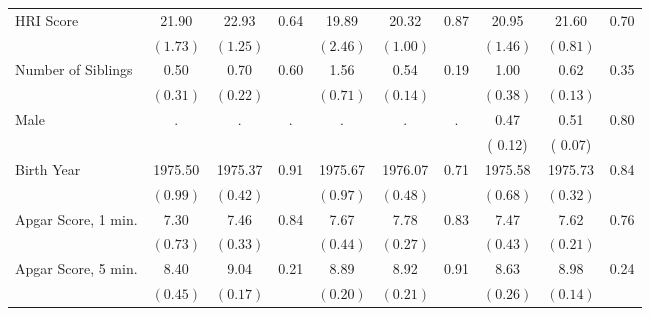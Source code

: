 \begin{tabular}{l c c c c c c c c c}
HRI Score &     21.90 &     22.93 &      0.64 &     19.89 &     20.32 &      0.87 &     20.95 &     21.60 &      0.70 \\
     & $ (     1.73) $ & $ (     1.25) $  & & $ (     2.46) $ & $ (     1.00) $ & & $ (     1.46) $ & $ (     0.81) $  & \\
Number of Siblings &      0.50 &      0.70 &      0.60 &      1.56 &      0.54 &      0.19 &      1.00 &      0.62 &      0.35 \\
     & $ (     0.31) $ & $ (     0.22) $  & & $ (     0.71) $ & $ (     0.14) $ & & $ (     0.38) $ & $ (     0.13) $  & \\
Male & . & . & . & . & . & . &      0.47 &      0.51 &      0.80 \\
&  & & & &  & & (     0.12) & (     0.07)  & \\
Birth Year &   1975.50 &   1975.37 &      0.91 &   1975.67 &   1976.07 &      0.71 &   1975.58 &   1975.73 &      0.84 \\
     & $ (     0.99) $ & $ (     0.42) $  & & $ (     0.97) $ & $ (     0.48) $ & & $ (     0.68) $ & $ (     0.32) $  & \\
Apgar Score, 1 min. &      7.30 &      7.46 &      0.84 &      7.67 &      7.78 &      0.83 &      7.47 &      7.62 &      0.76 \\
     & $ (     0.73) $ & $ (     0.33) $  & & $ (     0.44) $ & $ (     0.27) $ & & $ (     0.43) $ & $ (     0.21) $  & \\
Apgar Score, 5 min. &      8.40 &      9.04 &      0.21 &      8.89 &      8.92 &      0.91 &      8.63 &      8.98 &      0.24 \\
     & $ (     0.45) $ & $ (     0.17) $  & & $ (     0.20) $ & $ (     0.21) $ & & $ (     0.26) $ & $ (     0.14) $  & \\
\bottomrule
\end{tabular}